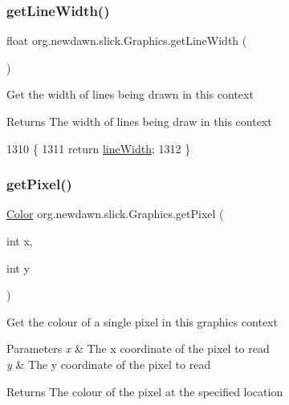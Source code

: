 \subsubsection{\texorpdfstring{get\+Line\+Width()}{getLineWidth()}}
{\footnotesize\ttfamily float org.\+newdawn.\+slick.\+Graphics.\+get\+Line\+Width (\begin{DoxyParamCaption}{ }\end{DoxyParamCaption})\hspace{0.3cm}{\ttfamily [inline]}}

Get the width of lines being drawn in this context

\begin{DoxyReturn}{Returns}
The width of lines being draw in this context 
\end{DoxyReturn}

\begin{DoxyCode}
1310                                 \{
1311         \textcolor{keywordflow}{return} \mbox{\hyperlink{classorg_1_1newdawn_1_1slick_1_1_graphics_a0f3d0e354937edf0872a2e79bc036b60}{lineWidth}};
1312     \}
\end{DoxyCode}
\mbox{\label{classorg_1_1newdawn_1_1slick_1_1_graphics_ad338ae801f15815df18bd3ac38bf6b19}} 
\subsubsection{\texorpdfstring{get\+Pixel()}{getPixel()}}
{\footnotesize\ttfamily \mbox{\hyperlink{classorg_1_1newdawn_1_1slick_1_1_color}{Color}} org.\+newdawn.\+slick.\+Graphics.\+get\+Pixel (\begin{DoxyParamCaption}\item[{int}]{x,  }\item[{int}]{y }\end{DoxyParamCaption})\hspace{0.3cm}{\ttfamily [inline]}}

Get the colour of a single pixel in this graphics context


\begin{DoxyParams}{Parameters}
{\em x} & The x coordinate of the pixel to read \\
\hline
{\em y} & The y coordinate of the pixel to read \\
\hline
\end{DoxyParams}
\begin{DoxyReturn}{Returns}
The colour of the pixel at the specified location 
\end{DoxyReturn}

